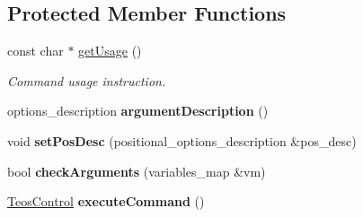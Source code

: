 \subsection*{Protected Member Functions}
\begin{DoxyCompactItemize}
\item 
const char $\ast$ \mbox{\hyperlink{classteos_1_1command_1_1_get_table_options_a764b61a7d83e508673b73100c45c3d13}{get\+Usage}} ()
\begin{DoxyCompactList}\small\item\em Command \textquotesingle{}usage\textquotesingle{} instruction. \end{DoxyCompactList}\item 
\mbox{\label{classteos_1_1command_1_1_get_table_options_a35a7ee5c807bf244c3ecb959f93f2f74}} 
options\+\_\+description {\bfseries argument\+Description} ()
\item 
\mbox{\label{classteos_1_1command_1_1_get_table_options_a2b6533c23e19f02dbcb1e942bec667b5}} 
void {\bfseries set\+Pos\+Desc} (positional\+\_\+options\+\_\+description \&pos\+\_\+desc)
\item 
\mbox{\label{classteos_1_1command_1_1_get_table_options_a89b799411002a56db84efdada9c8d203}} 
bool {\bfseries check\+Arguments} (variables\+\_\+map \&vm)
\item 
\mbox{\label{classteos_1_1command_1_1_get_table_options_a38ec528365a160cef25ceeba6e0cbfca}} 
\mbox{\hyperlink{classteos_1_1_teos_control}{Teos\+Control}} {\bfseries execute\+Command} ()
\end{DoxyCompactItemize}
